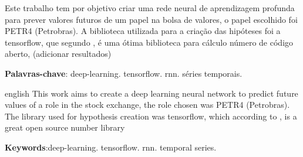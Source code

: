 \documentclass[
	article,			%
	11pt,				%
	oneside,			%
	a4paper,			%
	english,			%
	brazil,				%
	sumario=tradicional
	]{abntex2}
\begin{document}

\frenchspacing 


%
%

\maketitle





\begin{resumoumacoluna}
 Este trabalho tem por objetivo criar uma rede neural de aprendizagem profunda para prever valores futuros de um papel na bolsa de valores, o papel escolhido foi PETR4 (Petrobras). A biblioteca utilizada para a criação das hipóteses foi a tensorflow, que segundo , é uma ótima biblioteca para cálculo número de código aberto,  (adicionar resultados)
 \vspace{\onelineskip}
 
 \noindent
 \textbf{Palavras-chave}: deep-learning. tensorflow. rnn. séries temporais.
\end{resumoumacoluna}


\renewcommand{\resumoname}{Abstract}
\begin{resumoumacoluna}
 \begin{otherlanguage*}{english}
This work aims to create a deep learning neural network to predict future values of a role in the stock exchange, the role chosen was PETR4 (Petrobras). The library used for hypothesis creation was tensorflow, which according to , is a great open source number library

   \vspace{\onelineskip}
 
   \noindent
   \textbf{Keywords}:deep-learning. tensorflow. rnn. temporal series.
 \end{otherlanguage*}  
\end{resumoumacoluna}
\end{document}
